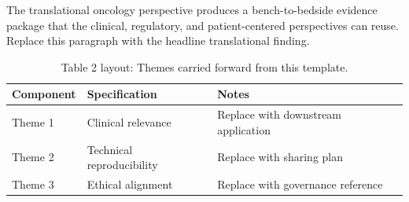 
The translational oncology perspective produces a bench-to-bedside evidence package that the clinical, regulatory, and patient-centered perspectives can reuse. Replace this paragraph with the headline translational finding.

\begin{table}[H]
\caption{Table 2 layout: Themes carried forward from this template.}
\label{tab:conclusions_themes}
\centering
\begin{tabular}{>{\raggedright\arraybackslash}p{3.4cm} >{\raggedright\arraybackslash}p{4.6cm} >{\raggedright\arraybackslash}p{5.4cm}}
\toprule
\textbf{Component} & \textbf{Specification} & \textbf{Notes} \\
\midrule
  Theme 1 & Clinical relevance & Replace with downstream application \\
  Theme 2 & Technical reproducibility & Replace with sharing plan \\
  Theme 3 & Ethical alignment & Replace with governance reference \\
\bottomrule
\end{tabular}
\end{table}
